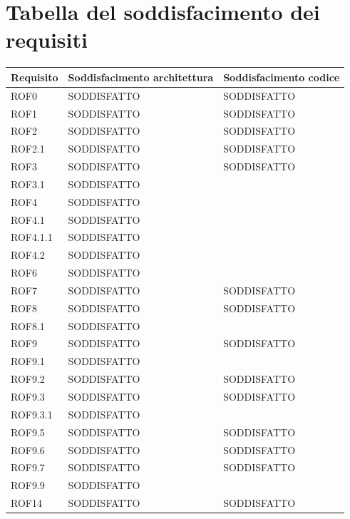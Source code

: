 \documentclass[openany,12pt,a4paper]{report}
\begin{document}
	\section{Tabella del soddisfacimento dei requisiti}
	\begin{longtable}{|p{40mm}|p{40mm}|p{40mm}|}
		\hline
		\centering \textbf{Requisito} & \textbf{Soddisfacimento architettura} &  \textbf{Soddisfacimento codice}\\
		
		\hline \centering ROF0 & SODDISFATTO & SODDISFATTO \\
		\hline \centering ROF1 & SODDISFATTO & SODDISFATTO\\
		\hline \centering ROF2 & SODDISFATTO & SODDISFATTO\\
		\hline \centering ROF2.1 & SODDISFATTO & SODDISFATTO\\
		\hline \centering ROF3 & SODDISFATTO & SODDISFATTO\\
		\hline \centering ROF3.1 & SODDISFATTO & \\
		\hline \centering ROF4 & SODDISFATTO &\\
		\hline \centering ROF4.1 & SODDISFATTO &\\
		\hline \centering ROF4.1.1 & SODDISFATTO &\\
		\hline \centering ROF4.2 & SODDISFATTO &\\
		\hline \centering ROF6 & SODDISFATTO &\\
		\hline \centering ROF7 & SODDISFATTO & SODDISFATTO\\
		\hline \centering ROF8 & SODDISFATTO & SODDISFATTO\\
		\hline \centering ROF8.1 & SODDISFATTO & \\
		\hline \centering ROF9 & SODDISFATTO & SODDISFATTO\\
		\hline \centering ROF9.1 & SODDISFATTO & \\
		\hline \centering ROF9.2 & SODDISFATTO & SODDISFATTO\\
		\hline \centering ROF9.3 & SODDISFATTO & SODDISFATTO\\
		\hline \centering ROF9.3.1 & SODDISFATTO & \\
		\hline \centering ROF9.5 & SODDISFATTO & SODDISFATTO\\
		\hline \centering ROF9.6 & SODDISFATTO & SODDISFATTO\\
		\hline \centering ROF9.7 & SODDISFATTO & SODDISFATTO\\
		\hline \centering ROF9.9 & SODDISFATTO & \\
		\hline \centering ROF14 & SODDISFATTO & SODDISFATTO\\
		\hline
		
	\end{longtable}
\end{document}
